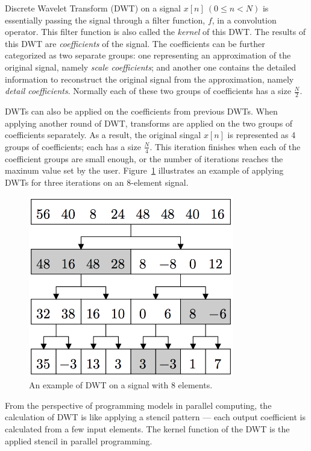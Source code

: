 Discrete Wavelet Transform (DWT) on a signal $x[n] \: (0 \leq n < N)$ is essentially
passing the signal through a filter function, $f$, 
in a convolution operator.
%
This filter function is also called the \textit{kernel} of this DWT.
%
The results of this DWT are \textit{coefficients} of the signal.
%
The coefficients can be further categorized as two separate groups: 
one representing an approximation of the original signal,
namely \textit{scale coefficients};
and another one contains the detailed information to reconstruct
the original signal from the approximation, namely 
\textit{detail coefficients}.
%
Normally each of these two groups of coefficients has a size $\frac{N}{2}$.


DWTs can also be applied on the coefficients from previous DWTs.
%
When applying another round of DWT, transforms are applied on the two
groups of coefficients separately.
%
As a result, the original singal $x[n]$ is represented as 4 groups of 
coefficients; each has a size $\frac{N}{4}$.
%
This iteration finishes when each of the coefficient groups are small enough,
or the number of iterations reaches the maxinum value set by the user. 
%
%
%
Figure~\ref{fig:example1} illustrates an example of applying DWTs for 
three iterations on an 8-element signal.



\begin{figure}
    \centering
    \includegraphics[width=0.8\textwidth]{fig/example1.png}
    \caption{An example of DWT on a signal with 8 elements.}
    \label{fig:example1}
\end{figure}



From the perspective of programming models in parallel computing, 
the calculation of DWT is like applying a stencil pattern --- 
each output coefficient is calculated from a few input elements. 
%
The kernel function of the DWT is the applied stencil in parallel programming.


